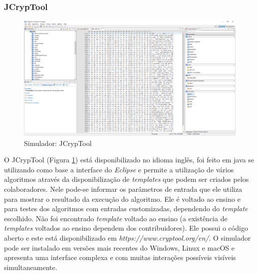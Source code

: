 
\subsubsection{JCrypTool}

\begin{figure}[H]
    \centering
    \caption{Simulador: JCrypTool}
    \label{fig:jcryptool}
    \includegraphics[width=1.2\linewidth,center]{Simuladores/JCrypTool.png}
\end{figure}

O JCrypTool (Figura \ref{fig:jcryptool}) está disponibilizado no idioma inglês, foi feito em java se utilizando como base a interface do \textit{Eclipse} e permite a utilização de vários algoritmos através da disponibilização de \textit{templates} que podem ser criados pelos colaboradores. Nele pode-se informar os parâmetros de entrada que ele utiliza para mostrar o resultado da execução do algoritmo. Ele é voltado ao ensino e para testes dos algoritmos com entradas customizadas, dependendo do \textit{template} escolhido. Não foi encontrado \textit{template} voltado ao ensino (a existência de \textit{templates} voltados ao ensino dependem dos contribuidores). Ele possui o código aberto e este está disponibilizado em \textit{https://www.cryptool.org/en/}. O simulador pode ser instalado em versões mais recentes do Windows, Linux e macOS e apresenta uma interface complexa e com muitas interações possíveis visíveis simultaneamente. \cite{cryptool16}

